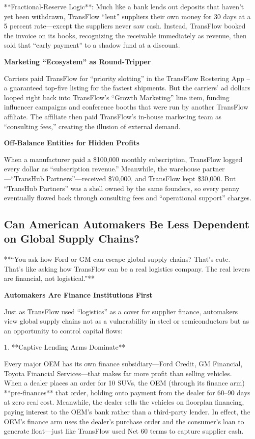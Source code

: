    **Fractional-Reserve Logic**: Much like a bank lends out deposits that haven’t yet been withdrawn, TransFlow “lent” suppliers their own money for 30 days at a 5 percent rate—except the suppliers never saw cash. Instead, TransFlow booked the invoice on its books, recognizing the receivable immediately as revenue, then sold that “early payment” to a shadow fund at a discount.

\textbf{Marketing “Ecosystem” as Round-Tripper}

   Carriers paid TransFlow for “priority slotting” in the TransFlow Rostering App – a guaranteed top-five listing for the fastest shipments. But the carriers’ ad dollars looped right back into TransFlow’s “Growth Marketing” line item, funding influencer campaigns and conference booths that were run by another TransFlow affiliate. The affiliate then paid TransFlow’s in-house marketing team as “consulting fees,” creating the illusion of external demand.

\textbf{Off-Balance Entities for Hidden Profits}

   When a manufacturer paid a \$100,000 monthly subscription, TransFlow logged every dollar as “subscription revenue.” Meanwhile, the warehouse partner—“TransHub Partners”—received \$70,000, and TransFlow kept \$30,000. But “TransHub Partners” was a shell owned by the same founders, so every penny eventually flowed back through consulting fees and “operational support” charges.


\subsection{Can American Automakers Be Less Dependent on Global Supply Chains?}

**“You ask how Ford or GM can escape global supply chains? That’s cute. That’s like asking how TransFlow can be a real logistics company. The real levers are financial, not logistical.”**

\textbf{Automakers Are Finance Institutions First}

Just as TransFlow used “logistics” as a cover for supplier finance, automakers view global supply chains not as a vulnerability in steel or semiconductors but as an opportunity to control capital flows:

1. **Captive Lending Arms Dominate**

   Every major OEM has its own finance subsidiary—Ford Credit, GM Financial, Toyota Financial Services—that makes far more profit than selling vehicles. When a dealer places an order for 10 SUVs, the OEM (through its finance arm) **pre-finances** that order, holding onto payment from the dealer for 60–90 days at zero real cost. Meanwhile, the dealer sells the vehicles on floorplan financing, paying interest to the OEM’s bank rather than a third-party lender. In effect, the OEM’s finance arm uses the dealer’s purchase order and the consumer’s loan to generate float—just like TransFlow used Net 60 terms to capture supplier cash.

